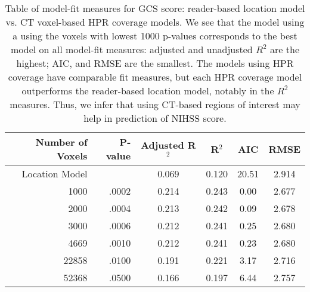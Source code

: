 \begin{table}[H]
\centering
\begin{tabular}{rr|cccc}
  \hline
{\bf Number of Voxels} & {\bf P-value} & {\bf Adjusted R$^2$} & {\bf R$^2$} & {\bf AIC} & {\bf RMSE} \\ 
  \hline
Location Model &  & 0.069 & 0.120 & 20.51 & 2.914 \\ 
  1000 & .0002 & 0.214 & 0.243 & 0.00 & 2.677 \\ 
  2000 & .0004 & 0.213 & 0.242 & 0.09 & 2.678 \\ 
  3000 & .0006 & 0.212 & 0.241 & 0.25 & 2.680 \\ 
  4669 & .0010 & 0.212 & 0.241 & 0.23 & 2.680 \\ 
  22858 & .0100 & 0.191 & 0.221 & 3.17 & 2.716 \\ 
  52368 & .0500 & 0.166 & 0.197 & 6.44 & 2.757 \\ 
   \hline
\end{tabular}
\caption{Table of model-fit measures for GCS score: reader-based location model vs. CT voxel-based HPR coverage models. We see that the model using a using the voxels with lowest 1000 p-values corresponds to the best model on all model-fit measures: adjusted and unadjusted $R^2$ are the highest; AIC, and RMSE are the smallest.  The models using HPR coverage have comparable fit measures, but each HPR coverage model outperforms the reader-based location model, notably in the $R^2$ measures.  Thus, we infer that using CT-based regions of interest may help in prediction of NIHSS score.} 
\label{t:gcs}
\end{table}
